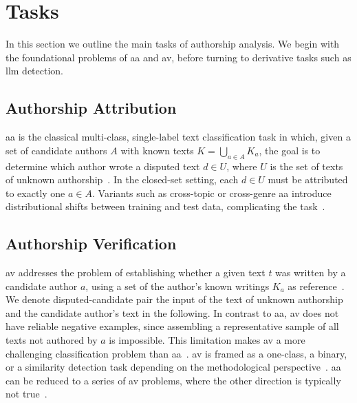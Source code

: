 \section{Tasks}

In this section we outline the main tasks of authorship analysis. 
We begin with the foundational problems of \ac{aa} and \ac{av}, before turning to derivative tasks such as \ac{llm} detection.

\subsection{Authorship Attribution}
\ac{aa} is the classical multi-class, single-label text classification task in which, given a set of candidate authors $A$ with known texts $K=\bigcup_{a\in A} K_a$, the goal is to determine which author wrote a disputed text $d \in U$, where $U$ is the set of texts of unknown authorship~\citep{koppel_authorship_2004,barlas_cross_domain_2020}. 
In the closed-set setting, each $d \in U$ must be attributed to exactly one $a \in A$. 
Variants such as cross-topic or cross-genre \ac{aa} introduce distributional shifts between training and test data, complicating the task~\citep{barlas_cross_domain_2020}.

\subsection{Authorship Verification}
\ac{av} addresses the problem of establishing whether a given text $t$ was written by a candidate author $a$, using a set of the author’s known writings $K_a$ as reference~\citep{koppel_authorship_2004}.
We denote disputed-candidate pair the input of the text of unknown authorship and the candidate author's text in the following.
In contrast to \ac{aa}, \ac{av} does not have reliable negative examples, since assembling a representative sample of all texts not authored by 
$a$ is impossible. 
This limitation makes \ac{av} a more challenging classification problem than \ac{aa}~\citep{llm_detection_av_2025,neal_surveying_2018,koppel_authorship_2004}.
\ac{av} is framed as a one-class, a binary, or a similarity detection task depending on the methodological perspective~\citep{neal_surveying_2018,koppel_authorship_2004}.  
\ac{aa} can be reduced to a series of \ac{av} problems, where the other direction is typically not true~\citep{barlas_cross_domain_2020,tyo_state_2022}.



